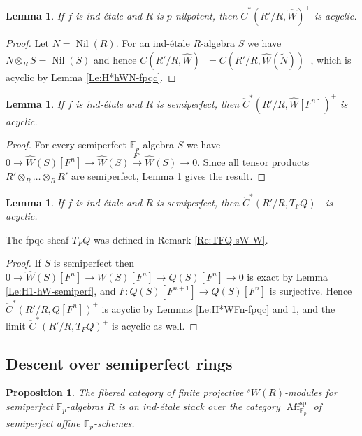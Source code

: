 \documentclass[a4paper,11pt]{amsart}
\theoremstyle{plain}
\newtheorem{Lemma}[equation]{Lemma}
\newtheorem{Prop}[equation]{Proposition}
\theoremstyle{definition}
\theoremstyle{remark}
\newcommand{\bLe}{\begin{Lemma}}
\newcommand{\eLe}{\end{Lemma}}
\newcommand{\bPr}{\begin{Prop}}
\newcommand{\ePr}{\end{Prop}}
\newcommand{\bproof}{\begin{proof}}
\newcommand{\eproof}{\end{proof}}
\numberwithin{equation}{section}
\newcommand{\FF}{{\mathbb{F}}}
\DeclareMathOperator{\semiperf}{sp}
\DeclareMathOperator{\Aff}{Aff}
\DeclareMathOperator{\Nil}{Nil}
\newcommand{\sW}{{}^sW}
\begin{document}
\bLe
\label{Le:H*hW-indet}
If $f$ is ind-\'etale and $R$ is $p$-nilpotent, then $\check C^*(R'/R,\hat W)^+$ is acyclic.
\eLe

\bproof
Let $N=\Nil(R)$. For an ind-\'etale $R$-algebra $S$ we have $N\otimes_RS=\Nil(S)$ and hence $C(R'/R,\hat W)^+=C(R'/R,\hat W(\tilde N))^+$, which is acyclic by Lemma \ref{Le:H*hWN-fpqc}.
\eproof

\bLe
\label{Le:H*hWFn-indet}
If $f$ is ind-\'etale and $R$ is semiperfect, then $\check C^*(R'/R,\hat W[{F^n}])^+$ is acyclic.
\eLe

\bproof
For every semiperfect $\FF_p$-algebra $S$ we have $0\to\hat W(S)[{F^n}]\to \hat W(S)\xrightarrow{F^n} \hat W(S)\to 0$.
Since all tensor products $R'\otimes_R\ldots\otimes_RR'$ are semiperfect, Lemma \ref{Le:H*hW-indet} gives the result.
\eproof

\bLe
\label{Le:H^*K-indet}
If $f$ is ind-\'etale and $R$ is semiperfect, then $\check C^*(R'/R,T_FQ)^+$ is acyclic.
\eLe

The fpqc sheaf $T_FQ$ was defined in Remark \ref{Re:TFQ-sW-W}.

\bproof
If $S$ is semiperfect then $0\to\hat W(S)[{F^n}]\to W(S)[{F^n}]\to Q(S)[F^n]\to 0$ is exact by Lemma \ref{Le:H1-hW-semiperf}, and $F\colon Q(S)[F^{n+1}]\to Q(S)[F^n]$ is surjective. Hence $\check C^*(R'/R,Q[F^n])^+$ is acyclic by Lemmas \ref{Le:H*WFn-fpqc} and \ref{Le:H*hWFn-indet}, and the limit $\check C^*(R'/R,T_FQ)^+$ is acyclic as well.
\eproof

\subsection{Descent over semiperfect rings}

\bPr
\label{Pr:Descent-LF(sW)-semiperf}
The fibered category of finite projective $\sW(R)$-modules for semiperfect $\FF_p$-algebras $R$ is an ind-\'etale stack over the category $\Aff_{\FF_p}^{\semiperf}$ of semiperfect affine $\FF_p$-schemes.
\ePr
\end{document}
